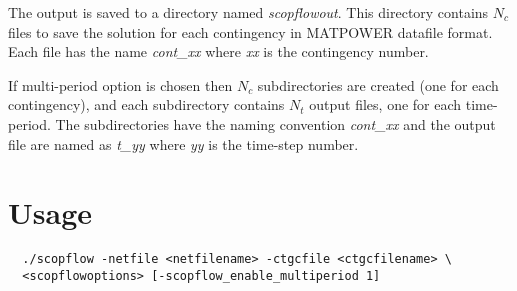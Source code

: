 The \scopflow output is saved to a directory named \emph{scopflowout}. This directory contains $N_c$ files to save the solution for each contingency in MATPOWER datafile format. Each file has the name \emph{cont\_xx} where \emph{xx} is the contingency number. 

If multi-period option is chosen then $N_c$ subdirectories are created (one for each contingency), and each subdirectory contains $N_t$ output files, one for each time-period. The subdirectories have the naming convention \emph{cont\_xx} and the output file are named as \emph{t\_yy} where \emph{yy} is the time-step number.

\section{Usage}

\begin{lstlisting}
  ./scopflow -netfile <netfilename> -ctgcfile <ctgcfilename> \
  <scopflowoptions> [-scopflow_enable_multiperiod 1]
\end{lstlisting}

